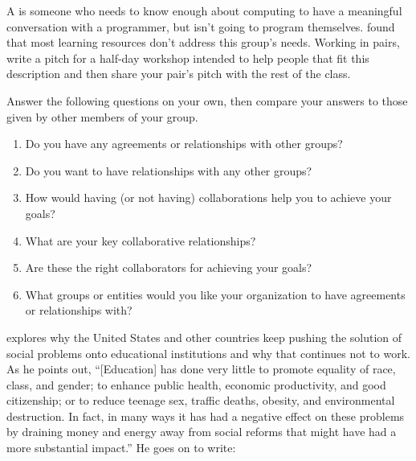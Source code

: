 A 
is someone who needs to know enough about computing
to have a meaningful conversation with a programmer,
but isn't going to program themselves.
\cite{Wang2018} found that most learning resources don't address this group's needs.
Working in pairs,
write a pitch for a half-day workshop intended to help people that fit this description
and then share your pair's pitch with the rest of the class.


Answer the following questions on your own,
then compare your answers to those given by other members of your group.

\begin{enumerate}

\item
  Do you have any agreements or relationships with other groups?

\item
  Do you want to have relationships with any other groups?

\item
  How would having (or not having) collaborations
  help you to achieve your goals?

\item
  What are your key collaborative relationships?

\item
  Are these the right collaborators for achieving your goals?

\item
  What groups or entities would you like your organization
  to have agreements or relationships with?

\end{enumerate}


\cite{Laba2008} explores why the United States and other countries
keep pushing the solution of social problems onto educational institutions
and why that continues not to work.
As he points out,
``[Education] has done very little to promote equality of race, class, and gender;
to enhance public health, economic productivity, and good citizenship;
or to reduce teenage sex, traffic deaths, obesity, and environmental destruction.
In fact,
in many ways it has had a negative effect on these problems
by draining money and energy away from social reforms that might have had a more substantial impact.''
He goes on to write:

